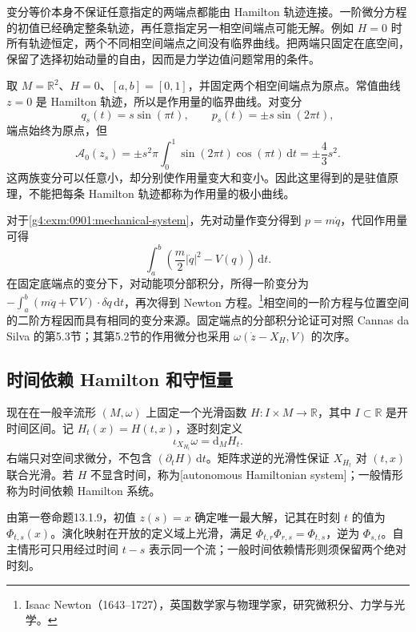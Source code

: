 \ProseParagraphBreak

变分等价本身不保证任意指定的两端点都能由 Hamilton 轨迹连接。一阶微分方程的初值已经确定整条轨迹，再任意指定另一相空间端点可能无解。例如 \(H=0\) 时所有轨迹恒定，两个不同相空间端点之间没有临界曲线。把两端只固定在底空间，保留了选择初始动量的自由，因而是力学边值问题常用的条件。

\begin{example}\label{g4:exm:0901:stationary-not-minimum}
	取 \(M=\mathbb R^2\)、\(H=0\)、\([a,b]=[0,1]\)，并固定两个相空间端点为原点。常值曲线 \(z=0\) 是 Hamilton 轨迹，所以是作用量的临界曲线。对变分
	\[
		q_s(t)=s\sin(\pi t),\qquad
		p_s(t)=\pm s\sin(2\pi t),
	\]
	端点始终为原点，但
	\[
		\mathcal A_0(z_s)
		=\pm s^2\pi\int_0^1\sin(2\pi t)\cos(\pi t)\,\mathrm{d}t
		=\pm\frac43s^2.
	\]
	这两族变分可以任意小，却分别使作用量变大和变小。因此这里得到的是驻值原理，不能把每条 Hamilton 轨迹都称为作用量的极小曲线。
\end{example}

对于\cref{g4:exm:0901:mechanical-system}，先对动量作变分得到 \(p=m\dot q\)，代回作用量可得
\[
	\int_a^b\left(\frac m2|\dot q|^2-V(q)\right)\,\mathrm{d}t.
\]
在固定底端点的变分下，对动能项分部积分，所得一阶变分为 \(-\int_a^b(m\ddot q+\nabla V)\cdot\delta q\,\mathrm{d}t\)，再次得到 Newton 方程。\footnote{Isaac Newton（1643--1727），英国数学家与物理学家，研究微积分、力学与光学。}相空间的一阶方程与位置空间的二阶方程因而具有相同的变分来源。固定端点的分部积分论证可对照 Cannas da Silva 的第5.3节；其第5.2节的作用微分也采用 \(\omega(\dot z-X_H,V)\) 的次序。\cite[第142--146页]{Cannas2006Symplectic}

\subsection{时间依赖 Hamilton 和守恒量}
\label{g4:subsec:0901:04}

现在在一般辛流形 \((M,\omega)\) 上固定一个光滑函数 \(H:I\times M\to\mathbb R\)，其中 \(I\subset\mathbb R\) 是开时间区间。记 \(H_t(x)=H(t,x)\)，逐时刻定义
\[
	\iota_{X_{H_t}}\omega=\mathrm{d}_M H_t.
\]
右端只对空间求微分，不包含 \((\partial_tH)\,\mathrm{d}t\)。矩阵求逆的光滑性保证 \(X_{H_t}\) 对 \((t,x)\) 联合光滑。若 \(H\) 不显含时间，称为[autonomous Hamiltonian system]；一般情形称为时间依赖 Hamilton 系统。

\ProseParagraphBreak

由第一卷命题13.1.9，初值 \(z(s)=x\) 确定唯一最大解，记其在时刻 \(t\) 的值为 \(\Phi_{t,s}(x)\)。演化映射在开放的定义域上光滑，满足 \(\Phi_{t,r}\Phi_{r,s}=\Phi_{t,s}\)，逆为 \(\Phi_{s,t}\)。自主情形可只用经过时间 \(t-s\) 表示同一个流；一般时间依赖情形则须保留两个绝对时刻。

